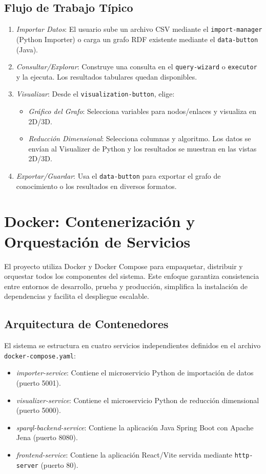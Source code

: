 \documentclass{article}
\begin{document}
\subsection{Flujo de Trabajo Típico}
\begin{enumerate}
    \item \textit{Importar Datos}: El usuario sube un archivo CSV mediante el \texttt{import-manager} (Python Importer) o carga un grafo RDF existente mediante el \texttt{data-button} (Java).
    \item \textit{Consultar/Explorar}: Construye una consulta en el \texttt{query-wizard} o \texttt{executor} y la ejecuta. Los resultados tabulares quedan disponibles.
    \item \textit{Visualizar}: Desde el \texttt{visualization-button}, elige:
    \begin{itemize}
        \item \textit{Gráfico del Grafo}: Selecciona variables para nodos/enlaces y visualiza en 2D/3D.
        \item \textit{Reducción Dimensional}: Selecciona columnas y algoritmo. Los datos se envían al Visualizer de Python y los resultados se muestran en las vistas 2D/3D.
    \end{itemize}
    \item \textit{Exportar/Guardar}: Usa el \texttt{data-button} para exportar el grafo de conocimiento o los resultados en diversos formatos.
\end{enumerate}




\section{Docker: Contenerización y Orquestación de Servicios}
El proyecto utiliza Docker y Docker Compose para empaquetar, distribuir y orquestar todos los componentes del sistema. Este enfoque garantiza consistencia entre entornos de desarrollo, prueba y producción, simplifica la instalación de dependencias y facilita el despliegue escalable.

\subsection{Arquitectura de Contenedores}
El sistema se estructura en cuatro servicios independientes definidos en el archivo \texttt{docker-compose.yaml}:

\begin{itemize}
    \item \textit{importer-service}: Contiene el microservicio Python de importación de datos (puerto 5001).
    \item \textit{visualizer-service}: Contiene el microservicio Python de reducción dimensional (puerto 5000).
    \item \textit{sparql-backend-service}: Contiene la aplicación Java Spring Boot con Apache Jena (puerto 8080).
    \item \textit{frontend-service}: Contiene la aplicación React/Vite servida mediante \texttt{http-server} (puerto 80).
\end{itemize}
\end{document}
